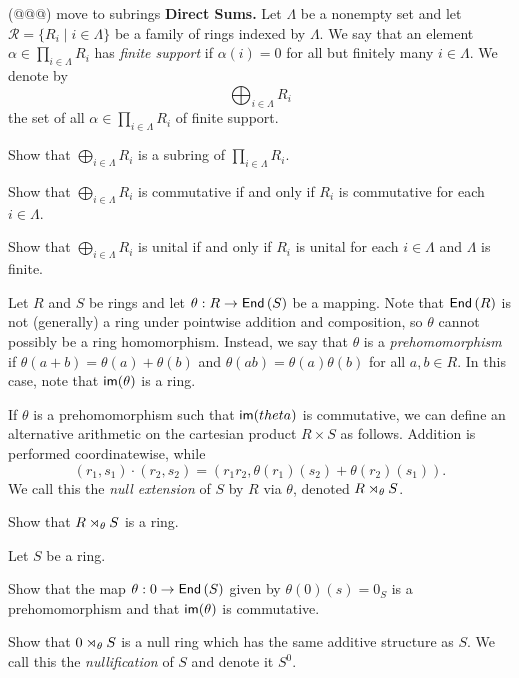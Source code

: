 \begin{exercise}
(@@@) move to subrings \textbf{Direct Sums.} Let \(\Lambda\) be a nonempty set and let \(\mathcal{R} = \{ R_i \mid i \in \Lambda \}\) be a family of rings indexed by \(\Lambda\).
We say that an element \(\alpha \in \prod_{i \in \Lambda} R_i\) has \emph{finite support} if \(\alpha(i) = 0\) for all but finitely many \(i \in \Lambda\).
We denote by \[ \bigoplus_{i \in \Lambda} R_i \] the set of all \(\alpha \in \prod_{i \in \Lambda} R_i\) of finite support.
\begin{proplist}
\item Show that \(\bigoplus_{i \in \Lambda} R_i\) is a subring of \(\prod_{i \in \Lambda} R_i\).
\item Show that \(\bigoplus_{i \in \Lambda} R_i\) is commutative if and only if \(R_i\) is commutative for each \(i \in \Lambda\).
\item Show that \(\bigoplus_{i \in \Lambda} R_i\) is unital if and only if \(R_i\) is unital for each \(i \in \Lambda\) and \(\Lambda\) is finite.
\end{proplist}
\end{exercise}


\begin{dfn} \label{dfn:null-extension}
Let \(R\) and \(S\) be rings and let \(\theta : R \rightarrow  \mathsf{End}\left(S\right) \) be a mapping.
Note that \( \mathsf{End}\left(R\right) \) is not (generally) a ring under pointwise addition and composition, so \(\theta\) cannot possibly be a ring homomorphism.
Instead, we say that \(\theta\) is a \emph{prehomomorphism} if \(\theta(a + b) = \theta(a) + \theta(b)\) and \(\theta(ab) = \theta(a)\theta(b)\) for all \(a,b \in R\).
In this case, note that \( \mathsf{im}(\theta) \) is a ring.

If \(\theta\) is a prehomomorphism such that \( \mathsf{im}(theta) \) is commutative, we can define an alternative arithmetic on the cartesian product \(R \times S\) as follows.
Addition is performed coordinatewise, while \[ (r_1, s_1) \cdot (r_2, s_2) = (r_1r_2, \theta(r_1)(s_2) + \theta(r_2)(s_1)). \]
We call this the \emph{null extension} of \(S\) by \(R\) via \(\theta\), denoted \(R \rtimes_{\theta} S\).
\end{dfn}


\begin{exercise}
Show that \(R \rtimes_{\theta} S\) is a ring.
\end{exercise}


\begin{exercise}
Let \(S\) be a ring.
\begin{proplist}
\item Show that the map \(\theta : 0 \rightarrow  \mathsf{End}\left(S\right) \) given by \(\theta(0)(s) = 0_S\) is a prehomomorphism and that \( \mathsf{im}(\theta) \) is commutative.
\item Show that \(0 \rtimes_{\theta} S\) is a null ring which has the same additive structure as \(S\).
We call this the \emph{nullification} of \(S\) and denote it \(S^0\).
\end{proplist}
\end{exercise}


